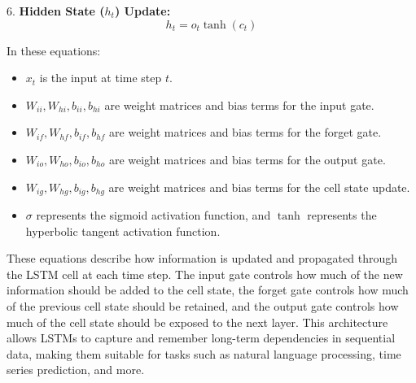 \documentclass[./main.tex]{subfiles}
\begin{document}
6. \textbf{Hidden State (\(h_t\)) Update:}
   \[ h_t = o_t\tanh(c_t) \]

In these equations:

\begin{itemize}
  \item \(x_t\) is the input at time step \(t\).
  \item \(W_{ii}, W_{hi}, b_{ii}, b_{hi}\) are weight matrices and bias terms for the input gate.
  \item \(W_{if}, W_{hf}, b_{if}, b_{hf}\) are weight matrices and bias terms for the forget gate.
  \item \(W_{io}, W_{ho}, b_{io}, b_{ho}\) are weight matrices and bias terms for the output gate.
  \item \(W_{ig}, W_{hg}, b_{ig}, b_{hg}\) are weight matrices and bias terms for the cell state update.
  \item \(\sigma\) represents the sigmoid activation function, and \(\tanh\) represents the hyperbolic tangent activation function.
\end{itemize}
\noindent
These equations describe how information is updated and propagated through the LSTM cell at each time step. The input gate controls how much of the new information should be added to the cell state, the forget gate controls how much of the previous cell state should be retained, and the output gate controls how much of the cell state should be exposed to the next layer.
\noindent
This architecture allows LSTMs to capture and remember long-term dependencies in sequential data, making them suitable for tasks such as natural language processing, time series prediction, and more. \cite{olah2015understanding}
\end{document}
